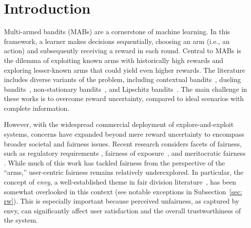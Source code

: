 \section{Introduction}
\label{chap: intro}
Multi-armed bandits (MABs) are a cornerstone of machine learning.
In this framework, a learner makes decisions sequentially, choosing an arm (i.e., an action) and subsequently receiving a reward in each round.
Central to MABs is the dilemma of exploiting known arms with historically high rewards and exploring lesser-known arms that could yield even higher rewards.
The literature includes diverse variants of the problem, including contextual bandits~\cite{chu2011contextual, slivkins2011contextual}, dueling bandits~\cite{yue2012k, cohen2021dueling}, non-stationary bandits~\cite{besbes2014stochastic, levine2017rotting}, and Lipschitz bandits~\cite{kleinberg2008multi}.
The main challenge in these works is to overcome reward uncertainty, compared to ideal scenarios with complete information.


However, with the widespread commercial deployment of explore-and-exploit systems, concerns have expanded beyond mere reward uncertainty to encompass broader societal and fairness issues.
Recent research considers facets of fairness, such as regulatory requirements \cite{patil2021achieving, bahar2020fiduciary,ron2021corporate}, fairness of exposure~\cite{ wang2021fairness, liu2017calibrated}, and meritocratic fairness \cite{joseph2016fairness}. While much of this work has tackled fairness from the perspective of the ``arms,'' user-centric fairness remains relatively underexplored. In particular, the concept of \textit{envy}, a well-established theme in fair division literature~\cite{moulin2004fair,procaccia2013cake}, has been somewhat overlooked in this context (see notable exceptions in Subsection~\ref{sec: rw}). This is especially important because perceived unfairness, as captured by envy, can significantly affect user satisfaction and the overall trustworthiness of the system.

